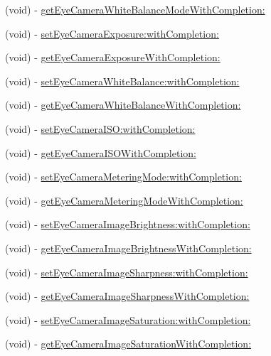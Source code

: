 \begin{DoxyCompactItemize}
(void) -\/ \hyperlink{interface_p_v_eye_camera_a82d529ab4f4f245580dc52cd54d7b174}{get\+Eye\+Camera\+White\+Balance\+Mode\+With\+Completion\+:}
\item 
(void) -\/ \hyperlink{interface_p_v_eye_camera_a666f4c3fd4b6979c5e62bbedee070b7f}{set\+Eye\+Camera\+Exposure\+:with\+Completion\+:}
\item 
(void) -\/ \hyperlink{interface_p_v_eye_camera_ac3439eeba740cbaf3d23d277126111f5}{get\+Eye\+Camera\+Exposure\+With\+Completion\+:}
\item 
(void) -\/ \hyperlink{interface_p_v_eye_camera_ae8bbb3316dc1a905958b1cc12fb86026}{set\+Eye\+Camera\+White\+Balance\+:with\+Completion\+:}
\item 
(void) -\/ \hyperlink{interface_p_v_eye_camera_a0be0498fe55127e830a89d2e9b844c9d}{get\+Eye\+Camera\+White\+Balance\+With\+Completion\+:}
\item 
(void) -\/ \hyperlink{interface_p_v_eye_camera_a2c8852b36ca981eafc68b18f142c96eb}{set\+Eye\+Camera\+I\+S\+O\+:with\+Completion\+:}
\item 
(void) -\/ \hyperlink{interface_p_v_eye_camera_a93336d0dd5b9899dd4e813df2771ebf6}{get\+Eye\+Camera\+I\+S\+O\+With\+Completion\+:}
\item 
(void) -\/ \hyperlink{interface_p_v_eye_camera_af020113c68a6a7e20c888ef2b6181c8a}{set\+Eye\+Camera\+Metering\+Mode\+:with\+Completion\+:}
\item 
(void) -\/ \hyperlink{interface_p_v_eye_camera_ab5b4e0c25271fe9c926952a66471c7af}{get\+Eye\+Camera\+Metering\+Mode\+With\+Completion\+:}
\item 
(void) -\/ \hyperlink{interface_p_v_eye_camera_a6f73da736c5c4bae29775134603754cf}{set\+Eye\+Camera\+Image\+Brightness\+:with\+Completion\+:}
\item 
(void) -\/ \hyperlink{interface_p_v_eye_camera_a5b87772c0b948e3c9468e2b801f0adfa}{get\+Eye\+Camera\+Image\+Brightness\+With\+Completion\+:}
\item 
(void) -\/ \hyperlink{interface_p_v_eye_camera_a6174bc9daacd3873ec14d368f36b5586}{set\+Eye\+Camera\+Image\+Sharpness\+:with\+Completion\+:}
\item 
(void) -\/ \hyperlink{interface_p_v_eye_camera_a8ac94cc19ba52ef5ea46ddc8aa49f538}{get\+Eye\+Camera\+Image\+Sharpness\+With\+Completion\+:}
\item 
(void) -\/ \hyperlink{interface_p_v_eye_camera_ab1a7bf35cd7079d0825305f6cdeb118a}{set\+Eye\+Camera\+Image\+Saturation\+:with\+Completion\+:}
\item 
(void) -\/ \hyperlink{interface_p_v_eye_camera_aa7367c91986834f4b8297224b3506bed}{get\+Eye\+Camera\+Image\+Saturation\+With\+Completion\+:}

\end{DoxyCompactItemize}
